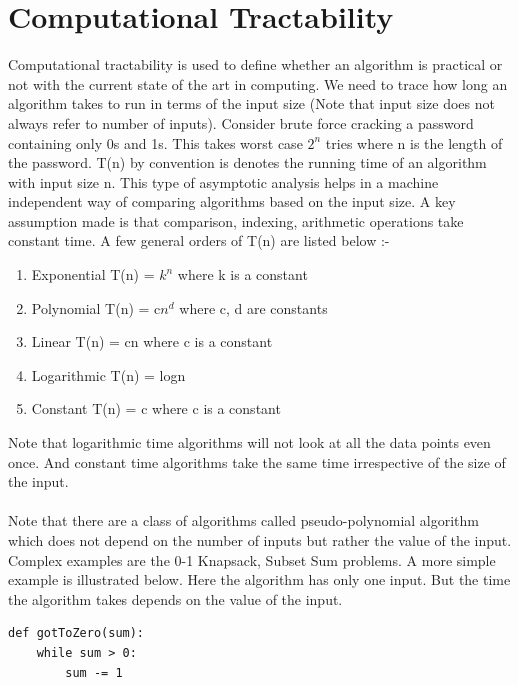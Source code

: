 


\section{Computational Tractability}

Computational tractability is used to define whether an algorithm is practical or not with the current state of the art in computing. We need to trace how long an algorithm takes to run in terms of the input size (Note that input size does not always refer to number of inputs). Consider brute force cracking a password containing only 0s and 1s. This takes worst case $2^n$ tries where n is the length of the password. T(n) by convention is denotes the running time of an algorithm with input size n. This type of asymptotic analysis helps in a machine independent way of comparing algorithms based on the input size. A key assumption made is that comparison, indexing, arithmetic operations take constant time. A few general orders of T(n) are listed below :-
\begin{enumerate}
  \item Exponential T(n) = $k^n$ where k is a constant
  \item Polynomial T(n) = c$n^d$ where c, d are constants
  \item Linear T(n) = cn where c is a constant
  \item Logarithmic T(n) = logn
  \item Constant T(n) = c where c is a constant
\end{enumerate}
Note that logarithmic time algorithms will not look at all the data points even once. And constant time algorithms take the same time irrespective of the size of the input.
\\\\Note that there are a class of algorithms called pseudo-polynomial algorithm which does not depend on the number of inputs but rather the value of the input. Complex examples are the 0-1 Knapsack, Subset Sum problems. A more simple example is illustrated below. Here the algorithm has only one input. But the time the algorithm takes depends on the value of the input.
\begin{lstlisting}
def gotToZero(sum):
    while sum > 0:
        sum -= 1
\end{lstlisting}

